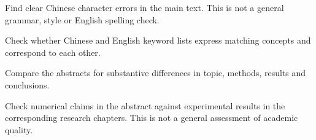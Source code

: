 \documentclass[12pt,a4paper]{article}
\begin{document}
\Needspace{26mm}\par{}\par Find clear Chinese character errors in the main text. This is not a general grammar, style or English spelling check.\par
\Needspace{26mm}\par{}\par Check whether Chinese and English keyword lists express matching concepts and correspond to each other.\par
\Needspace{26mm}\par{}\par Compare the abstracts for substantive differences in topic, methods, results and conclusions.\par
\Needspace{26mm}\par{}\par Check numerical claims in the abstract against experimental results in the corresponding research chapters. This is not a general assessment of academic quality.\par
\end{document}
